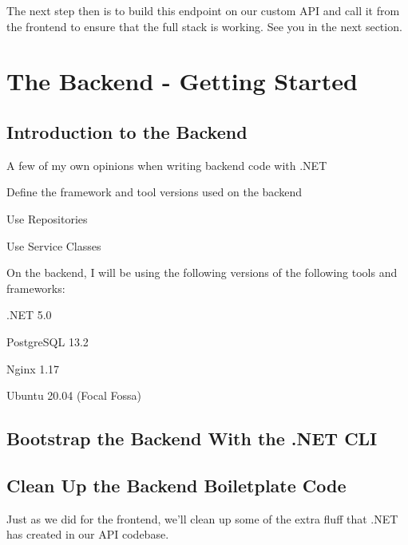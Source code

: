 \documentclass[paper=6in:9in,pagesize=pdftex,headinclude=on,footinclude=on,12pt]{scrbook}
\begin{document}
The next step then is to build this  endpoint on our custom API and call it from the frontend to ensure that the full stack is working. See you in the next section.

\chapter{The Backend - Getting Started}

\section{Introduction to the Backend}
\begin{arrows}
\item A few of my own opinions when writing backend code with .NET
\item Define the framework and tool versions used on the backend
\end{arrows}


\begin{arrows}
\item Use Repositories 
\item Use Service Classes
\end{arrows}


On the backend, I will be using the following versions of the following tools and frameworks:

\begin{arrows}
\item .NET 5.0
\item PostgreSQL 13.2
\item Nginx 1.17
\item Ubuntu 20.04 (Focal Fossa)
\end{arrows}

\section{Bootstrap the Backend With the .NET CLI}

\section{Clean Up the Backend Boiletplate Code}

Just as we did for the frontend, we'll clean up some of the extra fluff that .NET has created in our API codebase.
\end{document}
